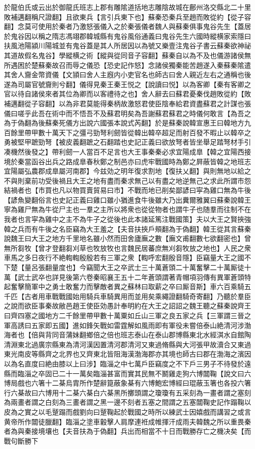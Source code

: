 於龍伯氏或云出於御龍氏班志上郡有雕隂道括地志雕陰故城在鄜州洛交縣北二十里敗補邁翻稱尺證翻】且欲東兵【言引兵東下也】蘇秦恐秦兵至趙而敗從約【從子容翻】念莫可使用於秦者乃激怒張儀入之於秦張儀者魏人與蘇秦俱事鬼谷先生【蓋居於鬼谷因以稱之隋志馮翊郡韓城縣有鬼谷風俗通義曰鬼谷先生六國時縱横家索隱曰扶風池陽潁川陽城並有鬼谷蓋是其人所居因以為號又樂壹注鬼谷子書云蘇秦欲神祕其道故假名鬼谷】學縱横之術【縱與從同音子容翻】蘇秦自以為不及也儀游諸侯無所遇困於楚蘇秦故召而辱之儀恐【恐史記作怒】念諸侯獨秦能苦趙遂入秦蘇秦隂遣其舍人齎金幣資儀【文頴曰舍人主廐内小吏官名也師古曰舍人親近左右之通稱也後遂為司屬官號齎則兮翻】儀得見秦王秦王悦之【說讀曰悦】以為客卿【秦有客卿之官以待自諸侯來者其位為卿而以客禮待之也】舍人辭去曰蘇君憂秦伐趙敗從約【敗補邁翻從子容翻】以為非君莫能得秦柄故激怒君使臣陰奉給君資盡蘇君之計謀也張儀曰嗟乎此吾在術中而不悟吾不及蘇君明矣為吾謝蘇君蘇君之時儀何敢言【為吾之為于偽翻為後蘇秦死儀方出說六國張本說式芮翻】於是蘇秦說韓宣惠王曰韓地方九百餘里帶甲數十萬天下之彊弓勁弩利劒皆從韓出韓卒超足而射百發不暇止以韓卒之勇被堅甲蹠勁弩【被皮義翻蹠之石翻踏也史記正義曰欲放弩者皆坐舉足踏弩材手引凑機然後發之】帶利劒一人當百不足言也大王事秦秦必求宜陽成臯【韓之宜陽西接境於秦當函谷出兵之路成臯春秋鄭之制邑亦曰虎牢戰國時為鄭之屛蔽皆韓之地班志宜陽屬弘農郡成臯屬河南郡】今兹効之明年復求割地【復扶乂翻】與則無地以給之不與則棄前功受後禍且大王之地有盡而秦求無己以有盡之地逆無己之求此所謂市怨結禍者也【市買也凡以物買賣貿易曰市】不戰而地已削矣鄙諺曰寜為雞口無為牛後【諺魚變翻俗言也史記正義曰雞口雖小猶進食牛後雖大乃出糞爾雅翼曰蘇秦說韓王寧為雞尸無為牛從尸主也一羣之主所以將衆也從從物者也謂牛子也随羣而往制不在我者也言寜為雞中之主不為牛子之從後也此本諸延篤注戰國策】夫以大王之賢挾強韓之兵而有牛後之名臣竊為大王羞之【夫音扶挾戶頰翻為于偽翻】韓王從其言蘇秦說魏王曰大王之地方千里地名雖小然而田舍廬廡之數【廡文甫翻數七欲翻密也】曾無所芻牧【曾才登翻芻刈草也牧放牧也言魏民居蕃庶無刈芻牧放之地也】人民之衆車馬之多日夜行不絶輷輷殷殷若有三軍之衆【輷呼宏翻殷音隱】臣竊量大王之國不下楚【量呂張翻量度也】今竊聞大王之卒武士三十萬蒼頭二十萬奮擊二十萬厮徒十萬【武士武卒也詳見後第六卷秦昭襄王五十二年蒼頭謂著青帽項羽傳有異軍蒼頭特起奮擊簡軍中之勇士敢奮力而擊敵者異之蘇林曰取薪之卒曰厮音斯】車六百乘騎五千匹【古者用車戰戰國始用騎兵車騎異用而並用矣乘繩證翻騎奇寄翻】乃聽於羣臣之說而欲臣事秦故敝邑趙王使臣効愚計奉明約在大王之詔詔之魏王聽之蘇秦說齊王曰齊四塞之國地方二千餘里帶甲數十萬粟如丘山三軍之良五家之兵【三軍謂三晉之軍高誘曰五家即五國】進如鋒矢戰如雷霆解如風雨即有軍役未嘗倍泰山絶清河涉渤海者也【倍與背同音蒲妹翻鄉倍之倍也班志泰山在泰山郡博縣東北水經淇水自館陶清淵東北過廣宗縣東為清河漢因置清河郡清河又東過脩縣與大河張甲故瀆合又東過東光南皮等縣齊之北界也又齊東北皆阻海漢渤海郡亦其境也師古曰郡在渤海之濱因以為名直度曰絶由膝以上曰涉】臨淄之中七萬戶臣竊度之不下戶三男子不待發於遠縣而臨淄之卒固已二十一萬矣臨淄甚富而實其民無不鬭雞走狗六博闒鞠【說文曰六博局戲也六箸十二棊烏胄所作楚辭箟蔽象棊有六博鮑宏博經曰琨蔽玉箸也各投六箸行六棊故曰六博用十二棊六棊白六棊黑所擲頭謂之瓊瓊有五采刻為一畫者謂之塞刻為兩畫者謂之白刻為三畫者謂之黑一邊不刻者五塞之間謂之五塞闒鞠史記作蹋鞠以皮為之實之以毛蹵蹋而戲劉向曰蹵鞠起於戰國之時所以練武士因嬉戲而講習之或言黄帝所作闒徒臘翻】臨淄之塗車轂擊人肩摩連袵成帷揮汗成雨夫韓魏之所以重畏秦者為與秦接境壤也【夫音扶為于偽翻】兵出而相當不十日而戰勝存亡之機决矣【而戰句斷勝下